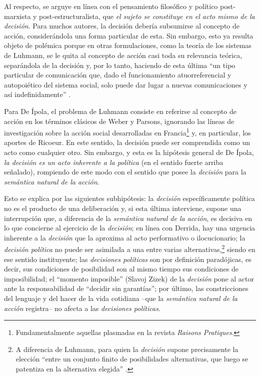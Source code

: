 Al respecto, se arguye en línea con el pensamiento filosófico y político post-marxista y post-estructuralista, que \emph{el sujeto se constituye en el acto mismo de la} \emph{decisión}. Para muchos autores, la decisión debería subsumirse al concepto de acción, considerándola una forma particular de esta. Sin embargo, esto ya resulta objeto de polémica porque en otras formulaciones, como la teoría de los sistemas de Luhmann, se le quita al concepto de acción casi toda su relevancia teórica, separándola de la decisión y, por lo tanto, haciendo de esta última \enquote{un tipo particular de comunicación que, dado el funcionamiento atuorreferencial y autopoiético del sistema social, solo puede dar lugar a nuevas comunicaciones y así indefinidamente} \parencite[71]{1600-DEIPOLA2001}.

Para De Ípola, el problema de Luhmann consiste en referirse al concepto de acción en los términos clásicos de Weber y Parsons, ignorando las líneas de investigación sobre la acción social desarrolladas en Francia\footnote{Fundamentalmente aquellas plasmadas en la revista \emph{Raisons Pratiques}.} y, en particular, los aportes de Ricoeur. En este sentido, la decisión puede ser comprendida como un acto como cualquier otro. Sin embargo, y esta es la hipótesis general de De Ípola, \emph{la decisión es un acto inherente a la política} (en el sentido fuerte arriba señalado), rompiendo de este modo con el sentido que posee la \emph{decisión} para la \emph{semántica natural de la acción}.

Esto se explica por las siguientes subhipótesis: la \emph{decisión} específicamente política no es el producto de una deliberación y, si esta última interviene, supone una interrupción que, a diferencia de la \emph{semántica natural de la acción}, es decisiva en lo que concierne al ejercicio de la \emph{decisión}; en línea con Derrida, hay una urgencia inherente a la \emph{decisión} que la aproxima al acto performativo o ilocucionario; la \emph{decisión política} no puede ser asimilada a una entre varias alternativas,\footnote{A diferencia de Luhmann, para quien la \emph{decisión} supone precisamente la elección \enquote{entre un conjunto finito de posibilidades alternativas, que luego se patentiza en la alternativa elegida} \parencite[71]{1600-DEIPOLA2001}.} siendo en ese sentido instituyente; las \emph{decisiones políticas} son por definición paradójicas, es decir, sus condiciones de posibilidad son al mismo tiempo sus condiciones de imposibilidad; el \enquote{momento imposible} (Slavoj Zizek) de la \emph{decisión} pone al actor ante la responsabilidad de \enquote{decidir sin garantías}; por último, las constricciones del lenguaje y del hacer de la vida cotidiana --que la \emph{semántica natural de la acción} registra-- no afecta a las \emph{decisiones políticas}.

